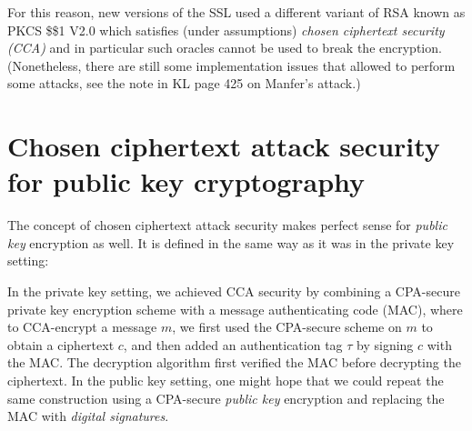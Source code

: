 For this reason, new versions of the SSL used a different variant of RSA
known as PKCS \$\sharp\$1 V2.0 which satisfies (under assumptions)
\emph{chosen ciphertext security (CCA)} and in particular such oracles
cannot be used to break the encryption. (Nonetheless, there are still
some implementation issues that allowed to perform some attacks, see the
note in KL page 425 on Manfer's attack.)

\section{Chosen ciphertext attack security for public key
cryptography}\label{Chosen-ciphertext-attack-}

The concept of chosen ciphertext attack security makes perfect sense for
\emph{public key} encryption as well. It is defined in the same way as
it was in the private key setting:

\hypertarget{CCSpubdef}{}

In the private key setting, we achieved CCA security by combining a
CPA-secure private key encryption scheme with a message authenticating
code (MAC), where to CCA-encrypt a message \(m\), we first used the
CPA-secure scheme on \(m\) to obtain a ciphertext \(c\), and then added
an authentication tag \(\tau\) by signing \(c\) with the MAC. The
decryption algorithm first verified the MAC before decrypting the
ciphertext. In the public key setting, one might hope that we could
repeat the same construction using a CPA-secure \emph{public key}
encryption and replacing the MAC with \emph{digital signatures}.

